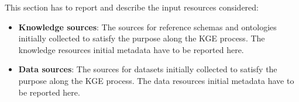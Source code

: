 
This section has to report and describe the input resources considered:
\begin{itemize}  
    \item \textbf{Knowledge sources}: The sources for reference schemas and ontologies initially collected to satisfy the purpose along the KGE process. The knowledge resources initial metadata have to be reported here.
    
    \item \textbf{Data sources}: The sources for datasets initially collected to satisfy the purpose along the KGE process. The data resources initial metadata have to be reported here.
\end{itemize}
